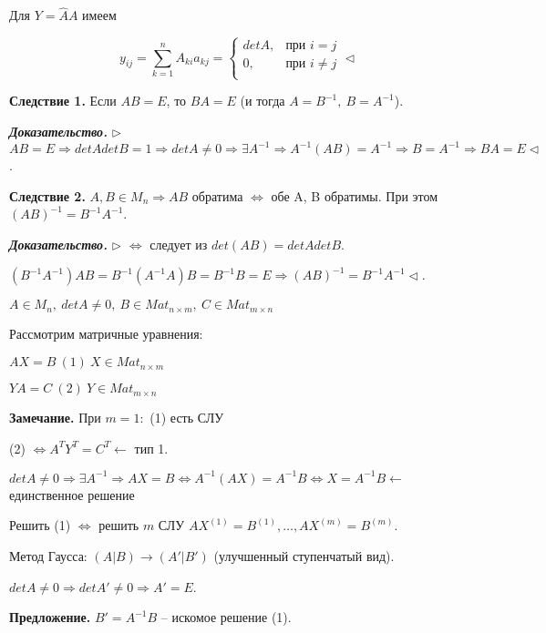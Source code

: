 \bigskip
Для $Y = \widehat{A} A$ имеем 

\begin{equation*}
	y_{ij} = \sum\limits_{k = 1}^n A_{ki} a_{kj} = \begin{cases}
		detA, &\text{при }  i = j  \\
		0, &\text{при } i \neq j \\
	\end{cases} \lhd
\end{equation*}

\bigskip
\textbf{Следствие 1.} Если $AB = E$, то $BA = E$ (и тогда $A = B^{-1}, \ B = A^{-1}$).

\bigskip
\textbf{\textit{Доказательство.}} $\rhd$ $AB = E \Rightarrow detA detB = 1 \Rightarrow detA \neq 0 \Rightarrow \exists A^{-1} \Rightarrow A^{-1}(AB) = A^{-1} \Rightarrow B = A^{-1} \Rightarrow BA = E \lhd$.

\bigskip
\textbf{Следствие 2.} $A, B \in M_n \Rightarrow AB$ обратима $\Leftrightarrow$ обе A, B обратимы. При этом $(AB)^{-1} = B^{-1} A^{-1}$.

\bigskip
\textbf{\textit{Доказательство.}} $\rhd$ $\Leftrightarrow$ следует из $det(AB) = detA detB$.

$(B^{-1} A^{-1})AB = B^{-1} (A^{-1} A) B = B^{-1} B = E \Rightarrow (AB)^{-1} = B^{-1} A^{-1} \lhd$.

\bigskip
$A \in M_n, \ detA \neq 0, \ B \in Mat_{n \times m}, \ C \in Mat_{m \times n}$

Рассмотрим матричные уравнения:

$AX = B \ (1) \ X \in Mat_{n \times m}$

$YA = C \ (2) \ Y \in Mat_{m \times n}$

\bigskip
\textbf{Замечание.} При $m=1:$ (1) есть СЛУ

(2) $\Leftrightarrow A^T Y^T = C^T \leftarrow$ тип 1.

$detA \neq 0 \Rightarrow \exists A^{-1} \Rightarrow AX = B \Leftrightarrow A^{-1}(AX)=A^{-1}B \Leftrightarrow X = A^{-1}B \leftarrow$ единственное решение

Решить (1) $\Leftrightarrow$ решить $m$ СЛУ $AX^{(1)} = B^{(1)}, \dots, AX^{(m)} = B^{(m)}$.

\bigskip
Метод Гаусса: $(A|B) \rightarrow (A'|B')$ (улучшенный ступенчатый вид).

$detA \neq 0 \Rightarrow detA' \neq 0 \Rightarrow A' = E$.

\bigskip
\textbf{Предложение.} $B' = A^{-1}B$ -- искомое решение (1).

